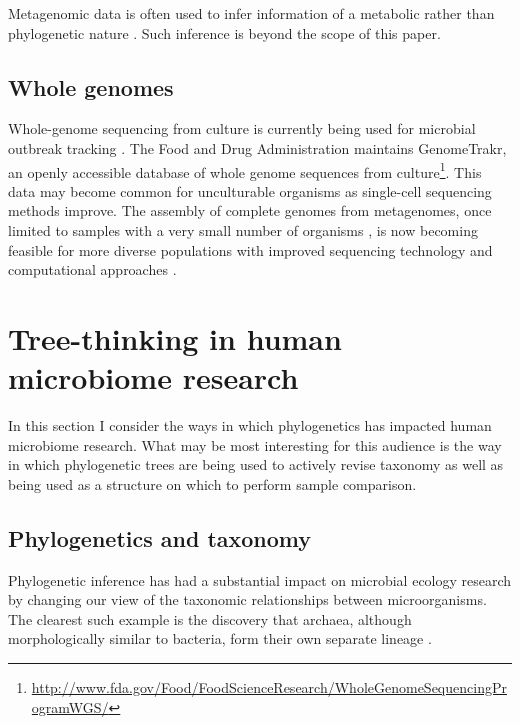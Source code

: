 \documentclass{amsart}
\begin{document}
Metagenomic data is often used to infer information of a metabolic rather than phylogenetic nature \citep{greenblum2012metagenomic,abubucker2012metabolic}.
Such inference is beyond the scope of this paper.


\subsection{Whole genomes}
Whole-genome sequencing from culture is currently being used for microbial outbreak tracking \citep{koser2012rapid,snitkin2012tracking}.
The Food and Drug Administration maintains GenomeTrakr, an openly accessible database of whole genome sequences from culture\footnote{\url{http://www.fda.gov/Food/FoodScienceResearch/WholeGenomeSequencingProgramWGS/}}.
This data may become common for unculturable organisms as single-cell sequencing methods \citep[reviewed in][]{kalisky2011single} improve.
The assembly of complete genomes from metagenomes, once limited to samples with a very small number of organisms \citep{baker2010enigmatic}, is now becoming feasible for more diverse populations with improved sequencing technology and computational approaches \citep{howe2012assembling,pell2012scaling,iverson2012untangling,emerson2012metagenomic,podell2013assembly}.


\section{Tree-thinking in human microbiome research}

In this section I consider the ways in which phylogenetics has impacted human microbiome research.
What may be most interesting for this audience is the way in which phylogenetic trees are being used to actively revise taxonomy as well as being used as a structure on which to perform sample comparison.

\subsection{Phylogenetics and taxonomy}

Phylogenetic inference has had a substantial impact on microbial ecology research by changing our view of the taxonomic relationships between microorganisms.
The clearest such example is the discovery that archaea, although morphologically similar to bacteria, form their own separate lineage \citep{woese1977phylogenetic}.
\end{document}
